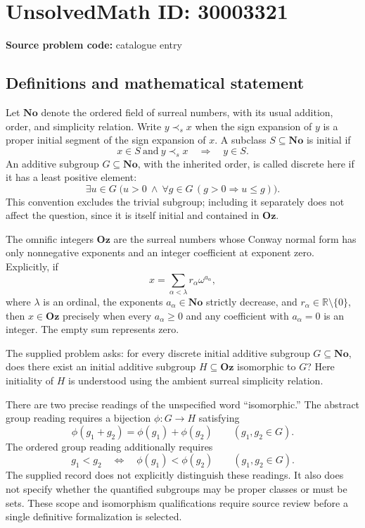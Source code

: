 \documentclass[11pt]{article}
\newcommand{\R}{\mathbb{R}}
\begin{document}
\section*{UnsolvedMath ID: 30003321}
\textbf{Source problem code:} catalogue entry
\subsection{Definitions and mathematical statement}
Let \(\mathbf{No}\) denote the ordered field of surreal numbers, with its usual addition, order, and simplicity relation. Write \(y\prec_s x\) when the sign expansion of \(y\) is a proper initial segment of the sign expansion of \(x\). A subclass \(S\subseteq\mathbf{No}\) is initial if
\[
 x\in S\ \text{and}\ y\prec_s x\quad\Longrightarrow\quad y\in S.
\]
An additive subgroup \(G\subseteq\mathbf{No}\), with the inherited order, is called discrete here if it has a least positive element:
\[
 \exists u\in G\;\bigl(u>0\ \land\ \forall g\in G\,(g>0\Rightarrow u\le g)\bigr).
\]
This convention excludes the trivial subgroup; including it separately does not affect the question, since it is itself initial and contained in \(\mathbf{Oz}\).

The omnific integers \(\mathbf{Oz}\) are the surreal numbers whose Conway normal form has only nonnegative exponents and an integer coefficient at exponent zero. Explicitly, if
\[
 x=\sum_{\alpha<\lambda}r_\alpha\omega^{a_\alpha},
\]
where \(\lambda\) is an ordinal, the exponents \(a_\alpha\in\mathbf{No}\) strictly decrease, and \(r_\alpha\in\R\setminus\{0\}\), then \(x\in\mathbf{Oz}\) precisely when every \(a_\alpha\ge0\) and any coefficient with \(a_\alpha=0\) is an integer. The empty sum represents zero.

The supplied problem asks: for every discrete initial additive subgroup \(G\subseteq\mathbf{No}\), does there exist an initial additive subgroup \(H\subseteq\mathbf{Oz}\) isomorphic to \(G\)? Here initiality of \(H\) is understood using the ambient surreal simplicity relation.

There are two precise readings of the unspecified word ``isomorphic.'' The abstract group reading requires a bijection \(\phi:G\to H\) satisfying
\[
 \phi(g_1+g_2)=\phi(g_1)+\phi(g_2)
 \qquad(g_1,g_2\in G).
\]
The ordered group reading additionally requires
\[
 g_1<g_2\quad\Longleftrightarrow\quad\phi(g_1)<\phi(g_2)
 \qquad(g_1,g_2\in G).
\]
The supplied record does not explicitly distinguish these readings. It also does not specify whether the quantified subgroups may be proper classes or must be sets. These scope and isomorphism qualifications require source review before a single definitive formalization is selected.
\end{document}
